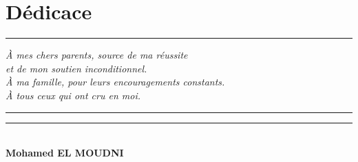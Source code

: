 \chapter*{Dédicace}
\thispagestyle{empty}

\vspace*{\fill}

\begin{center}
  {\color{accentcolor}\rule{3cm}{0.5pt}}
\end{center}

\vspace{1.2cm}

\begin{center}
  \begin{minipage}{0.72\textwidth}
    \centering
    {\Large\itshape
      À mes chers parents, source de ma réussite\\
      et de mon soutien inconditionnel.\\[4pt]
      À ma famille, pour leurs encouragements constants.\\[4pt]
      À tous ceux qui ont cru en moi.
    }
  \end{minipage}
\end{center}

\vspace{1.2cm}

\begin{center}
  {\color{accentcolor}\rule{3cm}{0.5pt}}
\end{center}

\vspace{2.5cm}

\begin{flushright}
  {\color{accentcolor}\rule{4cm}{0.4pt}}\\[8pt]
  {\sffamily\bfseries\large Mohamed EL MOUDNI}
\end{flushright}

\vspace*{\fill}

